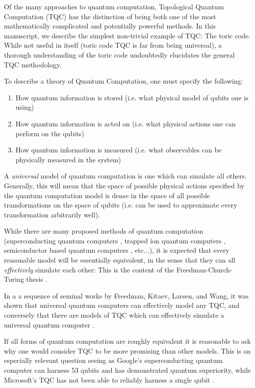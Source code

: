 \documentclass{article}
\theoremstyle{definition}
\numberwithin{figure}{section}
\begin{document}
Of the many approaches to quantum computation, Topological Quantum Computation (TQC) has the distinction of being both one of the most mathematically complicated and potentially powerful methods. In this manuscript, we describe the simplest non-trivial example of TQC: The toric code. While not useful in itself (toric code TQC is far from being universal), a thorough understanding of the toric code undoubtedly elucidates the general TQC methodology.

To describe a theory of Quantum Computation, one must specify the following:

\begin{enumerate}
\item How quantum information is stored (i.e. what physical model of qubits one is using)
\item How quantum information is acted on (i.e. what physical actions one can perform on the qubits)
\item How quantum information is measured (i.e. what observables can be physically measured in the system)
\end{enumerate}

A \textit{universal} model of quantum computation is one which can simulate all others. Generally, this will mean that the space of possible physical actions specified by the quantum computation model is dense in the space of all possible transformations on the space of qubits (i.e. can be used to approximate every transformation arbitrarily well).

While there are many proposed methods of quantum computation (superconducting quantum computers \cite{wendin2017quantum}, trapped ion quantum computers \cite{debnath2016demonstration}, semiconductor based quantum computers \cite{kane1998silicon}, etc...), it is expected that every reasonable model will be essentially equivalent, in the sense that they can all \textit{effectively} simulate each other: This is the content of the Freedman-Church-Turing thesis \cite{freedman2003topological}.

In a a sequence of seminal works by Freedman, Kitaev, Larsen, and Wang, it was shown that universal quantum computers can effectively model any TQC, and conversely that there are models of TQC which can effectively simulate a universal quantum computer \cite{freedman2002modular} \cite{freedman2002simulation}.

If all forms of quantum computation are roughly equivalent it is reasonable to ask why one would consider TQC to be more promising than other models. This is an especially relevant question seeing as Google's superconducting quantum computer can harness 53 qubits and has demonstrated quantum superiority, while Microsoft's TQC has not been able to reliably harness a single qubit \cite{arute2019quantum}.
\end{document}
